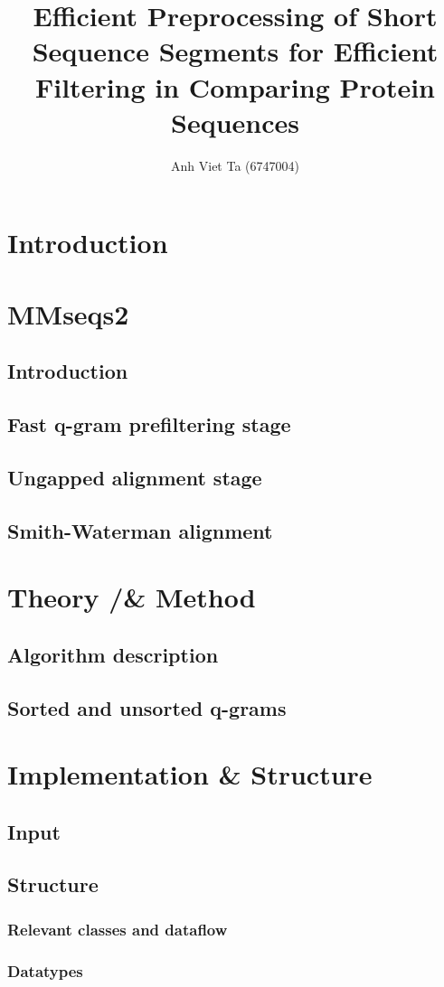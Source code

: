 \documentclass[11pt,a4paper]{scrartcl}
\title{Efficient Preprocessing of Short Sequence Segments for Efficient Filtering in Comparing Protein Sequences}
\author{Anh Viet Ta (6747004)}
\begin{document}
\section{Introduction}
\section{MMseqs2}
\subsection{Introduction}
\subsection{Fast q-gram prefiltering stage}
\subsection{Ungapped alignment stage}
\subsection{Smith-Waterman alignment}
\section{Theory /& Method}
\subsection{Algorithm description}
\subsection{Sorted and unsorted q-grams}
\section{Implementation \& Structure}
\subsection{Input}
\subsection{Structure}
\subsubsection{Relevant classes and dataflow}
\subsubsection{Datatypes}
\end{document}
